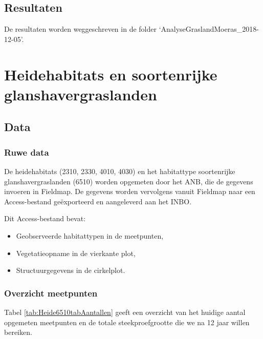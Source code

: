 \documentclass[twoside]{extreport}
\begin{document}
\section{Resultaten}\label{resultaten}

De resultaten worden weggeschreven in de folder
`AnalyseGraslandMoeras\_2018-12-05'.

\chapter{Heidehabitats en soortenrijke
glanshavergraslanden}\label{heidehabitats-en-soortenrijke-glanshavergraslanden}

\section{Data}\label{data-1}

\subsection{Ruwe data}\label{ruwe-data}

De heidehabitats (2310, 2330, 4010, 4030) en het habitattype
soortenrijke glanshavergraslanden (6510) worden opgemeten door het ANB,
die de gegevens invoeren in Fieldmap. De gegevens worden vervolgens
vanuit Fieldmap naar een Access-bestand geëxporteerd en aangeleverd aan
het INBO.

Dit Access-bestand bevat:

\begin{itemize}
\tightlist
\item
  Geobserveerde habitattypen in de meetpunten,
\item
  Vegetatieopname in de vierkante plot,
\item
  Structuurgegevens in de cirkelplot.
\end{itemize}

\subsection{Overzicht meetpunten}\label{overzicht-meetpunten-1}

Tabel \ref{tab:Heide6510tabAantallen} geeft een overzicht van het
huidige aantal opgemeten meetpunten en de totale steekproefgrootte die
we na 12 jaar willen bereiken.
\end{document}
